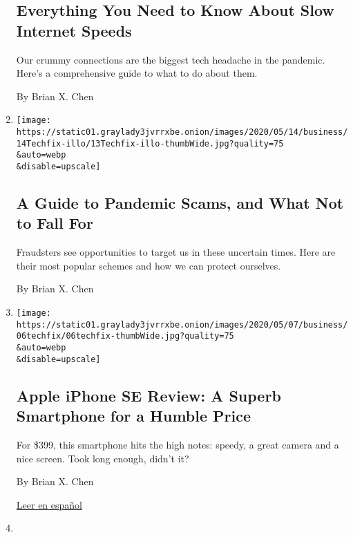 \begin{enumerate}
{  \subsection{Everything You Need to Know About Slow Internet
  Speeds}\label{everything-you-need-to-know-about-slow-internet-speeds}}

  Our crummy connections are the biggest tech headache in the pandemic.
  Here's a comprehensive guide to what to do about them.

  By Brian X. Chen
\item
  \href{/2020/05/13/technology/personaltech/pandemic-scams.html}{}

  \texttt{[image: https://static01.graylady3jvrrxbe.onion/images/2020/05/14/business/14Techfix-illo/13Techfix-illo-thumbWide.jpg?quality=75\\\&auto=webp\\\&disable=upscale]}

  \hypertarget{a-guide-to-pandemic-scams-and-what-not-to-fall-for}{%
  \subsection{A Guide to Pandemic Scams, and What Not to Fall
  For}\label{a-guide-to-pandemic-scams-and-what-not-to-fall-for}}

  Fraudsters see opportunities to target us in these uncertain times.
  Here are their most popular schemes and how we can protect ourselves.

  By Brian X. Chen
\item
  \href{/2020/05/06/technology/personaltech/apple-iphone-se-review.html}{}

  \texttt{[image: https://static01.graylady3jvrrxbe.onion/images/2020/05/07/business/06techfix/06techfix-thumbWide.jpg?quality=75\\\&auto=webp\\\&disable=upscale]}

  \hypertarget{apple-iphone-se-review-a-superb-smartphone-for-a-humble-price}{%
  \subsection{Apple iPhone SE Review: A Superb Smartphone for a Humble
  Price}\label{apple-iphone-se-review-a-superb-smartphone-for-a-humble-price}}

  For \$399, this smartphone hits the high notes: speedy, a great camera
  and a nice screen. Took long enough, didn't it?

  By Brian X. Chen

  \href{https://www.nytimes3xbfgragh.onion/es/2020/05/08/espanol/ciencia-y-tecnologia/iphone-SE.html}{Leer
  en español}
\item
  \href{/2020/04/21/technology/personaltech/apple-ipad-gadget-pandemic.html}{}


\end{enumerate}
